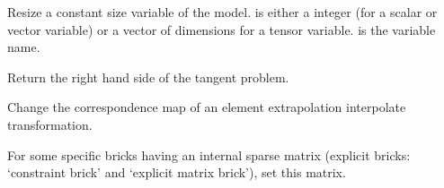 \documentclass[a4paper,11pt,english]{sphinxmanual}
\begin{document}
\begin{fulllineitems}

\begin{fulllineitems}
\label{\detokenize{python/cmdref_Model:getfem.Model.resize_variable}}
Resize a  constant size variable of the model.   is either a
integer (for a scalar or vector variable) or a vector of dimensions
for a tensor variable.  is the variable name.

\end{fulllineitems}


\begin{fulllineitems}
\label{\detokenize{python/cmdref_Model:getfem.Model.rhs}}
Return the right hand side of the tangent problem.

\end{fulllineitems}


\begin{fulllineitems}
\label{\detokenize{python/cmdref_Model:getfem.Model.set_element_extrapolation_correspondence}}
Change the correspondence map of an element extrapolation interpolate
transformation.

\end{fulllineitems}


\begin{fulllineitems}
\label{\detokenize{python/cmdref_Model:getfem.Model.set_private_matrix}}
For some specific bricks having an internal sparse matrix
(explicit bricks: ‘constraint brick’ and ‘explicit matrix brick’),
set this matrix.


\end{fulllineitems}
\end{fulllineitems}
\end{document}
